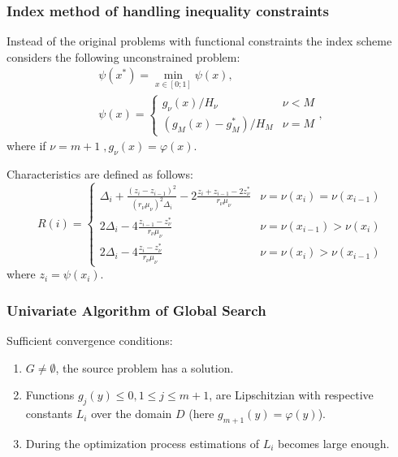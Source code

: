 \documentclass[aspectratio=1610]{beamer}
\begin{document}
\begin{frame}
  \frametitle{Index method of handling inequality constraints}
  Instead of the original problems with functional constraints the index scheme considers the following unconstrained problem:
  \begin{displaymath}
    \begin{array}{lr}
      \psi (x^{*})=\min_{x\in [0;1]}\psi (x), \\
      \psi (x)={\begin{cases}g_{\nu }(x)/H_{\nu }&\nu <M\\(g_{M}(x)-g_{M}^{*})/H_{M}&\nu =M\end{cases}},
    \end{array}
  \end{displaymath}
  where if \(\nu=m+1\;,g_\nu(x)=\varphi(x)\).

  Characteristics are defined as follows:
  \begin{displaymath}
    R(i)={\begin{cases}\Delta _{i}+{\frac {(z_{i}-z_{i-1})^{2}}{(r_{\nu }\mu _{\nu })^{2}\Delta _{i}}}-2{\frac {z_{i}+z_{i-1}-2z_{\nu }^{*}}{r_{\nu }\mu _{\nu }}}&\nu =\nu (x_{i})=\nu (x_{i-1})\\2\Delta _{i}-4{\frac {z_{i-1}-z_{\nu }^{*}}{r_{\nu }\mu _{\nu }}}&\nu =\nu (x_{i-1})>\nu (x_{i})\\2\Delta _{i}-4{\frac {z_{i}-z_{\nu }^{*}}{r_{\nu }\mu _{\nu }}}&\nu =\nu (x_{i})>\nu (x_{i-1})\end{cases}}
  \end{displaymath}
  where \(z_i=\psi(x_i)\).
\end{frame}

\begin{frame}
  \frametitle{Univariate Algorithm of Global Search}
  Sufficient convergence conditions:
  \begin{enumerate}
    \item \(G\ne\emptyset\), the source problem has a solution.
    \item Functions \(g_j(y)\leqslant 0, 1\leqslant j\leqslant m + 1\), are Lipschitzian with
respective constants \(L_i\) over the domain \(D\) (here \(g_{m+1}(y)=\varphi(y)\)).
    \item During the optimization process estimations of \(L_i\) becomes large enough.
  \end{enumerate}
\end{frame}
\end{document}

